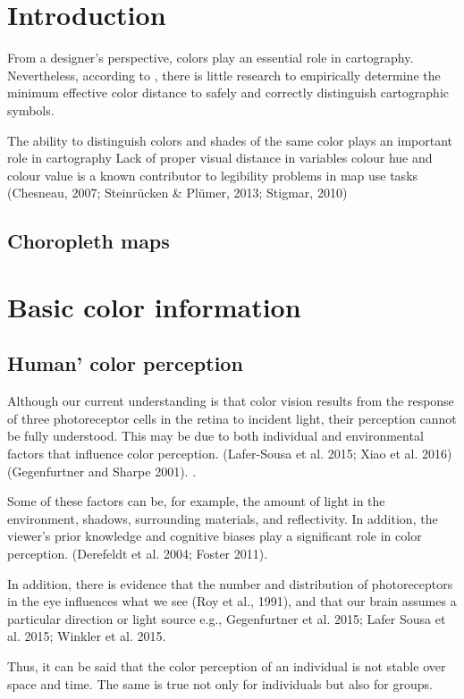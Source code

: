 \section{Introduction}
From a designer's perspective, colors play an essential role in cartography. Nevertheless, according to \textcite{brychtova2017}, there is little research to empirically determine the minimum effective color distance to safely and correctly distinguish cartographic symbols. 

The ability to distinguish colors and shades of the same color plays an important role in cartography \parencite{coltekin2017}
Lack of proper visual distance in variables colour hue and colour value is a known contributor to legibility problems in map use tasks (Chesneau, 2007; Steinrücken & Plümer, 2013; Stigmar, 2010)\parencite{brychtova2015}
\subsection{Choropleth maps}

\section{Basic color information}

\subsection{Human' color perception}
Although our current understanding is that color vision results from the response of three photoreceptor cells in the retina to incident light, their perception cannot be fully understood. This may be due to both individual and environmental factors that influence color perception. (Lafer-Sousa et al. 2015; Xiao et al. 2016) (Gegenfurtner and Sharpe 2001). .

Some of these factors can be, for example, the amount of light in the environment, shadows, surrounding materials, and reflectivity. In addition, the viewer's prior knowledge and cognitive biases play a significant role in color perception. (Derefeldt et al. 2004; Foster 2011). 

In addition, there is evidence that the number and distribution of photoreceptors in the eye influences what we see (Roy et al., 1991), and that our brain assumes a particular direction or light source e.g., Gegenfurtner et al. 2015; Lafer Sousa et al. 2015; Winkler et al. 2015. 

Thus, it can be said that the color perception of an individual is not stable over space and time. The same is true not only for individuals but also for groups.  

